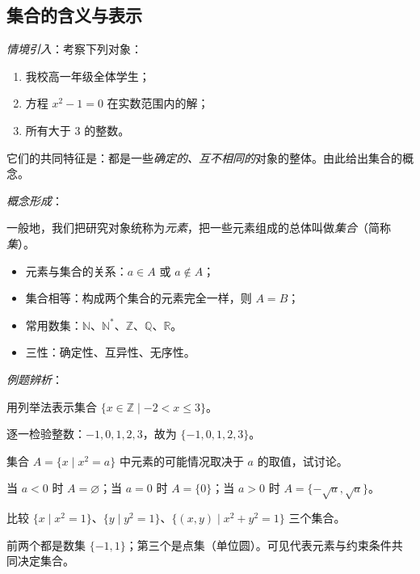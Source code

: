 \begin{procedure}

\section{集合的含义与表示}
\textit{情境引入}：考察下列对象：
\begin{enumerate}
  \item 我校高一年级全体学生；
  \item 方程 $x^2-1=0$ 在实数范围内的解；
  \item 所有大于 $3$ 的整数。
\end{enumerate}
它们的共同特征是：都是一些\emph{确定的、互不相同的}对象的整体。由此给出集合的概念。

\textit{概念形成}：
\begin{definition}
一般地，我们把研究对象统称为\emph{元素}，把一些元素组成的总体叫做\emph{集合}（简称\emph{集}）。
\end{definition}
\begin{itemize}
  \item 元素与集合的关系：$a\in A$ 或 $a\notin A$；
  \item 集合相等：构成两个集合的元素完全一样，则 $A=B$；
  \item 常用数集：$\mathbb{N}$、$\mathbb{N}^*$、$\mathbb{Z}$、$\mathbb{Q}$、$\mathbb{R}$。
  \item 三性：确定性、互异性、无序性。
\end{itemize}

\textit{例题辨析}：
\begin{example}
用列举法表示集合 $\{x\in\mathbb{Z}\mid -2<x\le 3\}$。
\end{example}
\begin{solution}
逐一检验整数：$-1,0,1,2,3$，故为 $\{-1,0,1,2,3\}$。
\end{solution}

\begin{example}
集合 $A=\{x\mid x^2=a\}$ 中元素的可能情况取决于 $a$ 的取值，试讨论。
\end{example}
\begin{solution}
当 $a<0$ 时 $A=\varnothing$；当 $a=0$ 时 $A=\{0\}$；当 $a>0$ 时 $A=\{-\sqrt{a},\sqrt{a}\}$。
\end{solution}

\begin{example}
比较 $\{x\mid x^2=1\}$、$\{y\mid y^2=1\}$、$\{(x,y)\mid x^2+y^2=1\}$ 三个集合。
\end{example}
\begin{solution}
前两个都是数集 $\{-1,1\}$；第三个是点集（单位圆）。可见代表元素与约束条件共同决定集合。
\end{solution}


\end{procedure}

